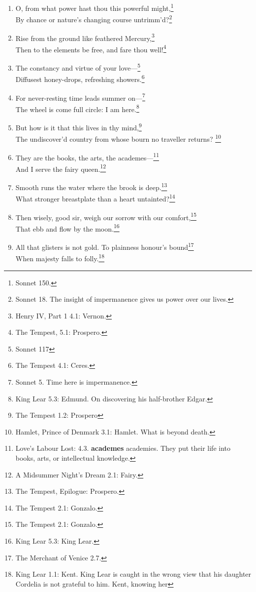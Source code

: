 \documentclass[17pt,twoside]{extarticle}
\begin{document}
\begin{enumerate}
\item
  O, from what power hast thou this powerful might,\footnote{Sonnet 150.}\\By
  chance or nature's changing course untrimm'd?\footnote{Sonnet 18. The
    insight of impermanence gives us power over our lives.}
\item
  Rise from the ground like feathered Mercury,\footnote{Henry IV, Part 1
    4.1: Vernon.}\\Then to the elements be free, and fare thou
  well!\footnote{The Tempest, 5.1: Prospero.}
\item
  The constancy and virtue of your love---\footnote{Sonnet 117}\\Diffusest
  honey-drops, refreshing showers.\footnote{The Tempest 4.1: Ceres.}
\item
  For never-resting time leads summer on---\footnote{Sonnet 5. Time here
    is impermanence.}\\The wheel is come full circle: I am
  here.\footnote{King Lear 5.3: Edmund. On discovering his half-brother
    Edgar.}
\item
  But how is it that this lives in thy mind,\footnote{The Tempest 1.2:
    Prospero}\\The undiscover'd country from whose bourn no traveller
  returns? \footnote{Hamlet, Prince of Denmark 3.1: Hamlet. What is
    beyond death.}
\item
  They are the books, the arts, the academes---\footnote{Love's Labour
    Lost: 4.3. \textbf{academes} academies. They put their life into
    books, arts, or intellectual knowledge.}\\And I serve the fairy
  queen.\footnote{A Midsummer Night's Dream 2.1: Fairy.}
\item
  Smooth runs the water where the brook is deep.\footnote{The Tempest,
    Epilogue: Prospero.}\\What stronger breastplate than a heart
  untainted?\footnote{The Tempest 2.1: Gonzalo.}
\item
  Then wisely, good sir, weigh our sorrow with our comfort,\footnote{The
    Tempest 2.1: Gonzalo.}\\That ebb and flow by the moon.\footnote{King
    Lear 5.3: King Lear.}
\item
  All that glisters is not gold. To plainness honour's bound\footnote{The
    Merchant of Venice 2.7.}\\When majesty falls to folly.\footnote{King
    Lear 1.1: Kent. King Lear is caught in the wrong view that his
    daughter Cordelia is not grateful to him. Kent, knowing her
}
\end{enumerate}
\end{document}
